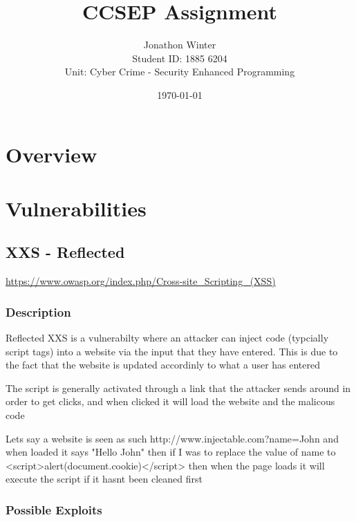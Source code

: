 \documentclass[titlepage]{article}
\title{CCSEP Assignment}
\date{\today}
\author{
   Jonathon Winter \\ 
   Student ID: 1885 6204 \\
   Unit: Cyber Crime - Security Enhanced Programming 
}
\begin{document}
\maketitle 
\newpage
{}

\setcounter{tocdepth}{2}
\tableofcontents
\newpage

\section{Overview} %
\label{sec:overview}


\section{Vulnerabilities} %
\label{sec:vulnerabilities}

   \subsection{XXS - Reflected} %
   \label{sub:xxs_reflected}

      \url{https://www.owasp.org/index.php/Cross-site_Scripting_(XSS)}
   
      \subsubsection{Description} %
      \label{ssub:xxs_reflected_description}
      
      Reflected XXS is a vulnerabilty where an attacker can inject code (typcially script tags) into a website via the input that they have entered. This is due to the fact that the website is updated accordinly to what a user has entered

      The script is generally activated through a link that the attacker sends around in order to get clicks, and when clicked it will load the website and the malicous code

      Lets say a website is seen as such http://www.injectable.com?name=John and when loaded it says "Hello John" then if I was to replace the value of name to <script>alert(document.cookie)</script> then when the page loads it will execute the script if it hasnt been cleaned first



      \subsubsection{Possible Exploits} %
      \label{ssub:xxs_reflected_possible_exploits}
      
\end{document}
